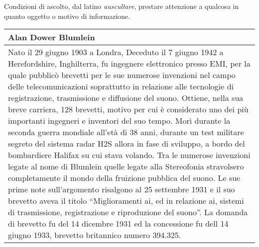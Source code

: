 Condizioni di ascolto, dal latino \emph{auscultare}, prestare attenzione a
qualcosa in quanto oggetto o motivo di informazione.%

\vfill\null

\begin{tabular}{L{.969\textwidth}}%
\toprule
	\textbf{Alan Dower Blumlein}\\
\midrule
Nato il 29 giugno 1903 a Londra, Deceduto il 7 giugno 1942 a Herefordshire,
Inghilterra, fu ingegnere elettronico presso EMI, per la quale pubblicò brevetti
per le sue numerose invenzioni nel campo delle telecomunicazioni soprattutto in
relazione alle tecnologie di registrazione, trasmissione e diffusione del suono.
Ottiene, nella sua breve carriera, 128 brevetti, motivo per cui è considerato
uno dei più importanti ingegneri e inventori del suo tempo. Morì durante la
seconda guerra mondiale all'età di 38 anni, durante un test militare segreto del
sistema radar H2S allora in fase di sviluppo, a bordo del bombardiere Halifax
su cui stava volando. Tra le numerose invenzioni legate al nome di Blumlein
quelle legate alla Stereofonia stravolsero completamente il mondo della
fruizione pubblica del suono. Le sue prime note sull'argomento risalgono al 25
settembre 1931 e il suo brevetto aveva il titolo “Miglioramenti ai, ed in
relazione ai, sistemi di trasmissione, registrazione e riproduzione del suono”.
La domanda di brevetto fu del 14 dicembre 1931 ed la concessione fu dell
14 giugno 1933, brevetto britannico numero 394.325.\\
\bottomrule
\end{tabular}






